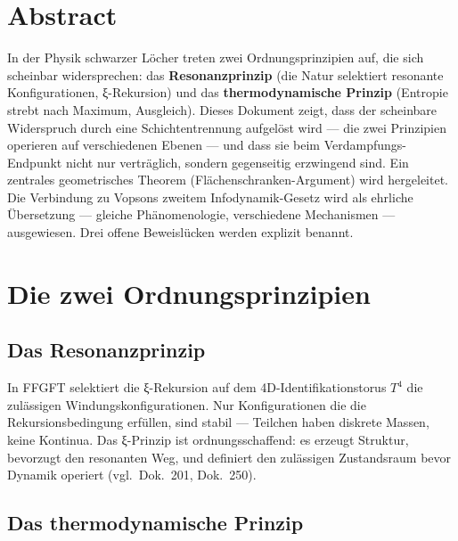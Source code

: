 
\section*{Abstract}

In der Physik schwarzer Löcher treten zwei Ordnungsprinzipien auf, die sich scheinbar widersprechen: das \textbf{Resonanzprinzip} (die Natur selektiert resonante Konfigurationen, ξ-Rekursion) und das \textbf{thermodynamische Prinzip} (Entropie strebt nach Maximum, Ausgleich). Dieses Dokument zeigt, dass der scheinbare Widerspruch durch eine Schichtentrennung aufgelöst wird --- die zwei Prinzipien operieren auf verschiedenen Ebenen --- und dass sie beim Verdampfungs-Endpunkt nicht nur verträglich, sondern gegenseitig erzwingend sind. Ein zentrales geometrisches Theorem (Flächen\-schranken-Argument) wird hergeleitet. Die Verbindung zu Vopsons zweitem Infodynamik-Gesetz wird als ehrliche Übersetzung --- gleiche Phänomenologie, verschiedene Mechanismen --- ausgewiesen. Drei offene Beweislücken werden explizit benannt.

\tableofcontents
\newpage

\section{Die zwei Ordnungsprinzipien}

\subsection{Das Resonanzprinzip}

In FFGFT selektiert die ξ-Rekursion auf dem 4D-Identifikationstorus $T^4$ die zulässigen Windungskonfigurationen. Nur Konfigurationen die die Rekursionsbedingung erfüllen, sind stabil --- Teilchen haben diskrete Massen, keine Kontinua. Das ξ-Prinzip ist ordnungsschaffend: es erzeugt Struktur, bevorzugt den resonanten Weg, und definiert den zulässigen Zustandsraum bevor Dynamik operiert (vgl.\ Dok.~201, Dok.~250).

\subsection{Das thermodynamische Prinzip}

